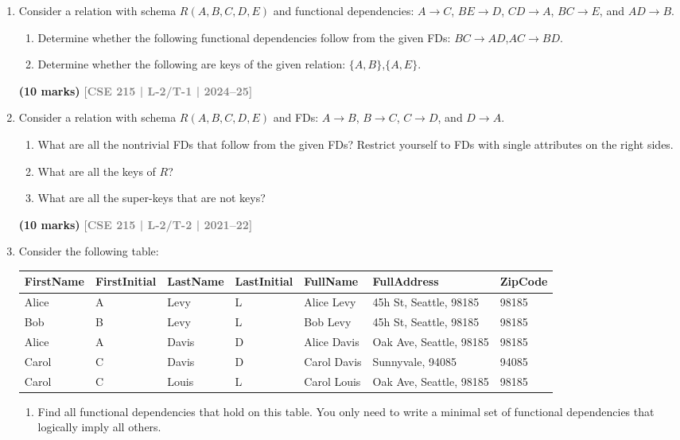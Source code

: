 \documentclass[12pt]{article}
\newcommand{\yr}[1]{\hfill\textcolor{gray}{\small\textbf{[#1]}}}
\newcommand{\mk}[1]{\textcolor{orange!70!black}{\small\textbf{(#1 marks)}}}
\begin{document}
\begin{enumerate}

\item Consider a relation with schema $R(A,B,C,D,E)$ and functional dependencies: $A \to C$, $BE \to D$, $CD \to A$, $BC \to E$, and $AD \to B$.
\begin{enumerate}
  \item Determine whether the following functional dependencies follow from the given FDs: $BC \to AD$,\quad $AC \to BD$.
  \item Determine whether the following are keys of the given relation: $\{A,B\}$,\quad $\{A,E\}$.
\end{enumerate}
\mk{10} \yr{CSE 215 | L-2/T-1 | 2024--25}


\item Consider a relation with schema $R(A, B, C, D, E)$ and FDs: $A \to B$, $B \to C$, $C \to D$, and $D \to A$.
\begin{enumerate}
  \item What are all the nontrivial FDs that follow from the given FDs? Restrict yourself to FDs with single attributes on the right sides.
  \item What are all the keys of $R$?
  \item What are all the super-keys that are not keys?
\end{enumerate}
\mk{10} \yr{CSE 215 | L-2/T-2 | 2021--22}


\item Consider the following table:

\medskip
\begin{center}
\small
\begin{tabular}{lllllll}
\toprule
\textbf{FirstName} & \textbf{FirstInitial} & \textbf{LastName} & \textbf{LastInitial} & \textbf{FullName} & \textbf{FullAddress} & \textbf{ZipCode}\\
\midrule
Alice & A & Levy  & L & Alice Levy  & 45h St, Seattle, 98185 & 98185\\
Bob   & B & Levy  & L & Bob Levy    & 45h St, Seattle, 98185 & 98185\\
Alice & A & Davis & D & Alice Davis & Oak Ave, Seattle, 98185 & 98185\\
Carol & C & Davis & D & Carol Davis & Sunnyvale, 94085 & 94085\\
Carol & C & Louis & L & Carol Louis & Oak Ave, Seattle, 98185 & 98185\\
\bottomrule
\end{tabular}
\end{center}
\begin{enumerate}
\item Find all functional dependencies that hold on this table. You only need to write a minimal set of functional dependencies that logically imply all others.


\end{enumerate}
\end{enumerate}
\end{document}
